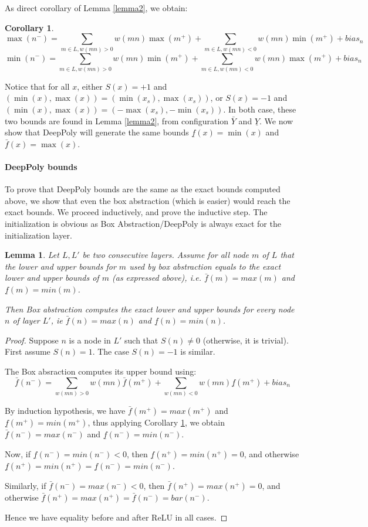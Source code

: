 \documentclass[]{article}
\newtheorem{lemma}{Lemma}
\newtheorem{corollary}{Corollary}
\theoremstyle{definition}
\begin{document}
As direct corollary of Lemma \ref{lemma2}, we obtain:

\begin{corollary}
	\label{cor1}
	$$\max(n^-)=\sum_{m \in L, w(m n)>0}w(m n) \max(m^+) + \sum_{m \in L, w(m n)<0}w(m n) \min(m^+) + bias_n$$
	$$\min(n^-)=\sum_{m \in L, w(m n)>0}w(m n) \min(m^+) + \sum_{m \in L, w(m n)<0}w(m n) \max(m^+) + bias_n$$
\end{corollary}
	

Notice that for all $x$, either $S(x)=+1$ and 
$(\min(x),\max(x))=(\min(x_s),\max(x_s))$, 
or $S(x)=-1$ and $(\min(x),\max(x))=(-\max(x_s),-\min(x_s))$.
In both case, these two bounds are found in Lemma \ref{lemma2},
from configuration $\bar{Y}$ and $\underline{Y}$.
We now show that DeepPoly will generate the same bounds 
$\underline{f}(x)=\min(x)$ and $\bar{f}(x)=\max(x)$.

\paragraph{DeepPoly bounds}

To prove that DeepPoly bounds are the same as the exact bounds computed above, 
we show that even the box abstraction (which is easier) would reach the exact bounds.
We proceed inductively, and prove the inductive step.
The initialization is obvious as Box Abstraction/DeepPoly is always exact for the initialization layer.

\begin{lemma}
	Let $L,L'$ be two consecutive layers.
	Assume for all node $m$ of $L$ that the lower and upper bounds for $m$ used by box abstraction equals to the exact lower and upper bounds of $m$ (as expressed above), i.e.
	$\bar{f}(m)=max(m)$ and $\underline{f}(m)=min(m)$.
	
	Then Box abstraction computes the exact lower and upper bounds for every node $n$ of layer $L'$, ie $\bar{f}(n)=max(n)$ and $\underline{f}(n)=min(n)$.
\end{lemma}

\begin{proof}
	Suppose $n$ is a node in $L'$ such that $S(n)\neq 0$ (otherwise, it is trivial). 
	First assume $S(n)=1$. The case $S(n)=-1$ is similar. 

	The Box absraction computes its upper bound using:
	$$\bar{f}(n^-)= \sum_{w(mn)>0} w(mn) \bar{f}(m^+) + \sum_{w(mn)<0} w(mn) \underline{f}(m^+) + bias_n$$

	By induction hypothesis, we have 
	$\bar{f}(m^+)=max(m^+)$ and
	$\underline{f}(m^+)=min(m^+)$, thus 
	applying Corollary \ref{cor1}, we obtain
	$\bar{f}(n^-)=max(n^-)$ and 
	$\underline{f}(n^-)=min(n^-)$.

	Now, if $\underline{f}(n^-)=min(n^-)<0$, 
	then $\underline{f}(n^+)=min(n^+)=0$, 
	and otherwise 
	$\underline{f}(n^+)=min(n^+)=\underline{f}(n^-)=min(n^-)$.

	Similarly, 
	if $\bar{f}(n^-)=max(n^-)<0$, 
	then $\bar{f}(n^+)=max(n^+)=0$, 
	and otherwise 
	$\bar{f}(n^+)=max(n^+)=\bar{f}(n^-)=bar(n^-)$.
	
	Hence we have equality before and after ReLU in all cases.
\end{proof}
\end{document}
